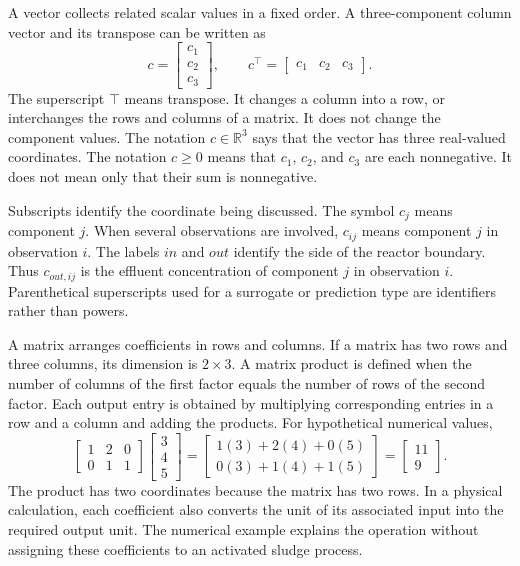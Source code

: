 A vector collects related scalar values in a fixed order. A three-component column vector and its transpose can be written as
\[
c=\begin{bmatrix}c_1\\c_2\\c_3\end{bmatrix},\qquad
c^\top=\begin{bmatrix}c_1&c_2&c_3\end{bmatrix}.
\]
The superscript $\top$ means transpose. It changes a column into a row, or interchanges the rows and columns of a matrix. It does not change the component values. The notation $c\in\mathbb{R}^3$ says that the vector has three real-valued coordinates. The notation $c\geq0$ means that $c_1$, $c_2$, and $c_3$ are each nonnegative. It does not mean only that their sum is nonnegative.

Subscripts identify the coordinate being discussed. The symbol $c_j$ means component $j$. When several observations are involved, $c_{ij}$ means component $j$ in observation $i$. The labels $in$ and $out$ identify the side of the reactor boundary. Thus $c_{out,ij}$ is the effluent concentration of component $j$ in observation $i$. Parenthetical superscripts used for a surrogate or prediction type are identifiers rather than powers.

A matrix arranges coefficients in rows and columns. If a matrix has two rows and three columns, its dimension is $2\times3$. A matrix product is defined when the number of columns of the first factor equals the number of rows of the second factor. Each output entry is obtained by multiplying corresponding entries in a row and a column and adding the products. For hypothetical numerical values,
\[
\begin{bmatrix}1&2&0\\0&1&1\end{bmatrix}
\begin{bmatrix}3\\4\\5\end{bmatrix}
=\begin{bmatrix}1(3)+2(4)+0(5)\\0(3)+1(4)+1(5)\end{bmatrix}
=\begin{bmatrix}11\\9\end{bmatrix}.
\]
The product has two coordinates because the matrix has two rows. In a physical calculation, each coefficient also converts the unit of its associated input into the required output unit. The numerical example explains the operation without assigning these coefficients to an activated sludge process.

